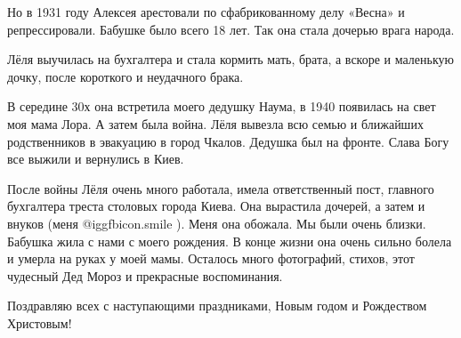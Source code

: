 \zzrule

Но в 1931 году Алексея арестовали по сфабрикованному делу «Весна» и
репрессировали. Бабушке было всего 18 лет. Так она стала дочерью врага народа. 

Лёля выучилась на бухгалтера и стала кормить мать, брата, а вскоре и маленькую
дочку, после короткого и неудачного брака.

В середине 30х она встретила моего дедушку Наума, в 1940 появилась на свет моя
мама Лора. А затем была война. Лёля вывезла всю семью и ближайших родственников
в эвакуацию в город Чкалов. Дедушка был на фронте. Слава Богу все выжили и
вернулись в Киев.

После войны Лёля очень много работала, имела ответственный пост, главного
бухгалтера треста столовых города Киева. Она вырастила дочерей, а затем и
внуков (меня  @igg{fbicon.smile} ). Меня она обожала. Мы были очень близки. Бабушка жила с нами с
моего рождения. В конце жизни она очень сильно болела и умерла на руках у моей
мамы. Осталось много фотографий, стихов, этот чудесный Дед Мороз и прекрасные
воспоминания.

Поздравляю всех с наступающими праздниками, Новым годом и Рождеством Христовым!
